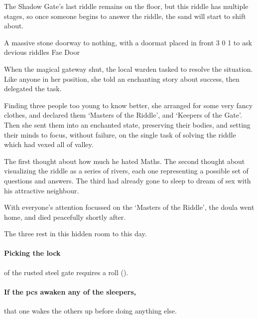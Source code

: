 The Shadow Gate's last riddle remains on the floor, but this riddle has multiple stages, so once someone begins to answer the riddle, the sand will start to shift about.

  {A massive stone doorway to nothing, with a doormat placed in front}%
  {3}%
  {0}%
  {1}%
  {to ask devious riddles}%
  {Fae Door}%
  {
    \setcounter{Fire}{3}
    \setcounter{Earth}{2}
    \setcounter{Fate}{1}
    \setcounter{Water}{1}
    \setcounter{Academics}{2}
    \setcounter{Wyldcrafting}{1}
  }%

\showStdSpells[
  \setcounter{diceNo}{0}
]


\begin{exampletext}
  When the magical gateway shut, the local \gls{warden} tasked  to resolve the situation.
  Like anyone in her position, she told an enchanting story about success, then delegated the task.

  Finding three people too young to know better, she arranged for some very fancy clothes, and declared them `Masters of the Riddle', and `Keepers of the Gate'.
  Then she sent them into an enchanted state, preserving their bodies, and setting their minds to focus, without failure, on the single task of solving the riddle which had vexed all of \gls{valley}.

  The first thought about how much he hated Maths.
  The second thought about visualizing the riddle as a series of rivers, each one representing a possible set of questions and answers.
  The third had already gone to sleep to dream of sex with his attractive neighbour.

  With everyone's attention focussed on the `Masters of the Riddle', the \gls{doula} went home, and died peacefully shortly after.

  The three rest in this hidden room to this day.
\end{exampletext}

\paragraph{Picking the lock}
of the rusted steel gate requires a  roll (\tn[16]).

\paragraph{If the \glspl{pc} awaken any of the sleepers,}
that one wakes the others up before doing anything else.

